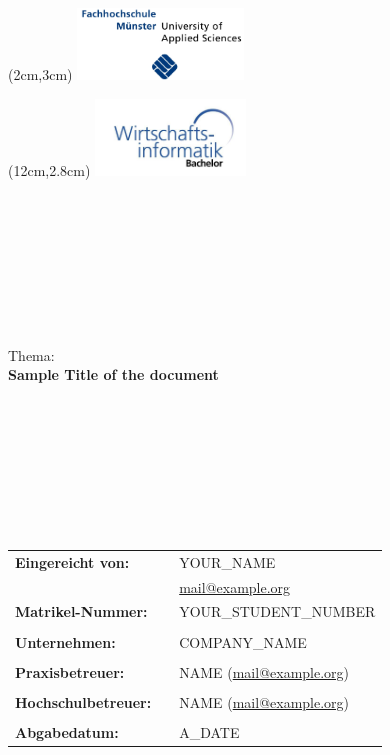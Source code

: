 \thispagestyle{empty}

\begin{textblock*}{188mm}(2cm,3cm)
\includegraphics[width=0.33\textwidth]{img/logo_fh.jpg}
\end{textblock*}

\begin{textblock*}{188mm}(12cm,2.8cm)
\includegraphics[width=0.3\textwidth]{img/logo_wi.jpg}
\end{textblock*}

\begin{verbatim}








\end{verbatim}
\begin{center}
Thema: \\ 
\textbf{\large{Sample Title of the document}} \\
\end{center}


\begin{verbatim}








\end{verbatim}

\begin{flushleft}
\begin{tabular}{lll}
\textbf{Eingereicht von:} & & YOUR\_NAME \\
\textbf{} & & \href{mailto:mail@example.org}{mail@example.org}\\
\textbf{Matrikel-Nummer:} & & YOUR\_STUDENT\_NUMBER \\
& & \\
\textbf{Unternehmen:} & & COMPANY\_NAME \\
& & \\
\textbf{Praxisbetreuer:} & & NAME (\href{mailto:mail@example.org}{mail@example.org}) \\
& & \\
\textbf{Hochschulbetreuer:} & & NAME (\href{mailto:mail@example.org}{mail@example.org}) \\
& & \\
\textbf{Abgabedatum:} & & A\_DATE \\
\end{tabular}
\end{flushleft}

\newpage